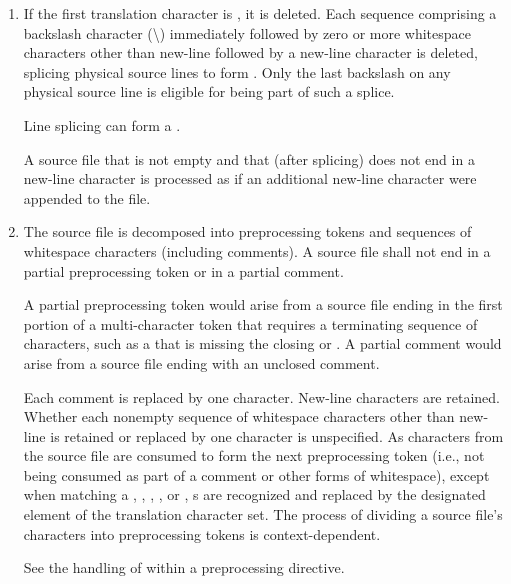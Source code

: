 \begin{enumerate}
\item
{}%
If the first translation character is ,
it is deleted.
Each sequence comprising a backslash character (\textbackslash)
immediately followed by
zero or more whitespace characters other than new-line followed by
a new-line character is deleted, splicing
physical source lines to form . Only the last
backslash on any physical source line is eligible for being part
of such a splice.
\begin{note}
Line splicing can form
a .
\end{note}
A source file that is not empty and that (after splicing)
does not end in a new-line character
is processed as if an additional new-line character were appended
to the file.

\item The source file is decomposed into preprocessing
tokens and sequences of whitespace characters
(including comments). A source file shall not end in a partial
preprocessing token or in a partial comment.
\begin{footnote}
A partial preprocessing
token would arise from a source file
ending in the first portion of a multi-character token that requires a
terminating sequence of characters, such as a 
that is missing the closing 
or \tcode{>}. A partial comment
would arise from a source file ending with an unclosed \tcode{/*}
comment.
\end{footnote}
Each comment is replaced by one  character. New-line characters are
retained. Whether each nonempty sequence of whitespace characters other
than new-line is retained or replaced by one  character is
unspecified.
As characters from the source file are consumed
to form the next preprocessing token
(i.e., not being consumed as part of a comment or other forms of whitespace),
except when matching a
,
,
,
, or
,
s are recognized and
replaced by the designated element of the translation character set.
The process of dividing a source file's
characters into preprocessing tokens is context-dependent.
\begin{example}
See the handling of \tcode{<} within a  preprocessing
directive.
\end{example}


\end{enumerate}

